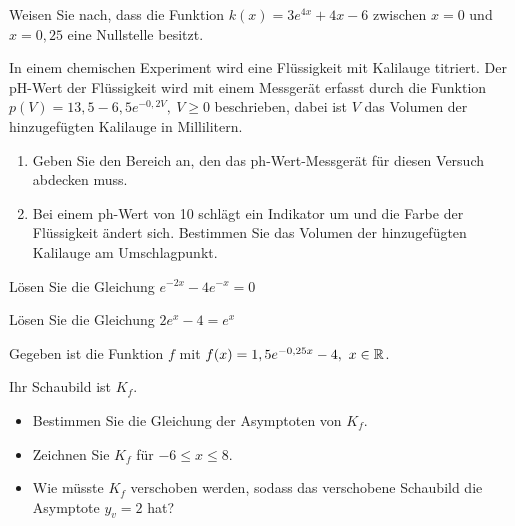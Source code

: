 \begin{Exercise}[title={Zeitansatz 4 min, ohne Taschenrechner}, label=eFktVA_9]%

    Weisen Sie nach, dass die Funktion \(k(x)=3e^{4x}+4x-6\) zwischen \(x=0\) und \(x=0,25\) eine Nullstelle besitzt.
\end{Exercise}
\begin{Exercise}[title={Zeitansatz 10 min, mit Taschenrechner}, label=eFktVA_10]%

In einem chemischen Experiment wird eine Flüssigkeit mit Kalilauge titriert. Der pH-Wert der Flüssigkeit wird mit einem Messgerät erfasst durch die Funktion \(p(V)=13,5-6,5e^{-0,2V},\ V\geq0\) beschrieben, dabei ist \(V\) das Volumen der hinzugefügten Kalilauge in Millilitern.
\begin{enumerate}[label=\alph*)]
    \item Geben Sie den Bereich an, den das ph-Wert-Messgerät für diesen Versuch abdecken muss.
    \item Bei einem ph-Wert von 10 schlägt ein Indikator um und die Farbe der Flüssigkeit ändert sich. Bestimmen Sie das Volumen der hinzugefügten Kalilauge am Umschlagpunkt.
\end{enumerate}
\end{Exercise}
\begin{Exercise}[title={Zeitansatz 8 min, ohne Taschenrechner}, label=eFktVA_11]%

Lösen Sie die Gleichung \(e^{-2x}-4e^{-x}=0\)
\end{Exercise}
\begin{Exercise}[title={Zeitansatz 6 min, ohne Taschenrechner}, label=eFktVA_12]%

Lösen Sie die Gleichung \(2e^x-4=e^x\)
\end{Exercise}
\begin{Exercise}[title={Zeitansatz 10 min, mit Taschenrechner}, label=eFktVA_13]%

Gegeben ist die Funktion \(f\) mit \(f(x)=1,5e^{-0,25x}-4,\ x\in\R\).

Ihr Schaubild ist \(K_f\).
\begin{itemize}
    \item Bestimmen Sie die Gleichung der Asymptoten von \(K_f\).
    \item Zeichnen Sie \(K_f\) für \(-6\leq x\leq8\).
    \item Wie müsste \(K_f\) verschoben werden, sodass das verschobene Schaubild die Asymptote \(y_v=2\) hat?
\end{itemize}
\end{Exercise}
